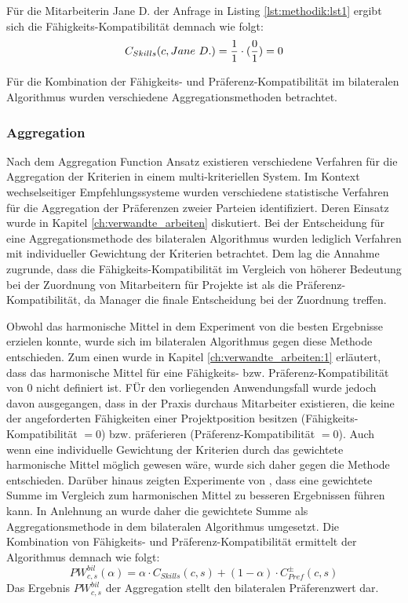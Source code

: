 Für die Mitarbeiterin Jane D. der Anfrage in Listing \ref{lst:methodik:lst1} ergibt sich die Fähigkeits-Kompatibilität demnach wie folgt:
\begin{equation}\label{methodik:eq:5}
    C_{Skills}(c,Jane \textnormal{ }D.) = \frac{1}{1} \cdot (\frac{0}{1}) = 0
\end{equation}

Für die Kombination der Fähigkeits- und Präferenz-Kompatibilität im bilateralen Algorithmus wurden verschiedene Aggregationsmethoden betrachtet.

\subsubsection{Aggregation}
Nach dem Aggregation Function Ansatz existieren verschiedene Verfahren für die Aggregation der Kriterien in einem multi-kriteriellen System.
Im Kontext wechselseitiger Empfehlungssysteme wurden verschiedene statistische Verfahren für die Aggregation der Präferenzen zweier Parteien identifiziert.
Deren Einsatz wurde in Kapitel \ref{ch:verwandte_arbeiten} diskutiert.
Bei der Entscheidung für eine Aggregationsmethode des bilateralen Algorithmus wurden lediglich Verfahren mit individueller Gewichtung der Kriterien betrachtet.
Dem lag die Annahme zugrunde, dass die Fähigkeits-Kompatibilität im Vergleich von höherer Bedeutung bei der Zuordnung von Mitarbeitern für Projekte ist als die Präferenz-Kompatibilität, da Manager die finale Entscheidung bei der Zuordnung treffen.

Obwohl das harmonische Mittel in dem Experiment von \textcite[S. 1ff.]{kumari:2:inproceedings} die besten Ergebnisse erzielen konnte, wurde sich im bilateralen Algorithmus gegen diese Methode entschieden.
Zum einen wurde in Kapitel \ref{ch:verwandte_arbeiten:1} erläutert, dass das harmonische Mittel für eine Fähigkeits- bzw. Präferenz-Kompatibilität von 0 nicht definiert ist.
FÜr den vorliegenden Anwendungsfall wurde jedoch davon ausgegangen, dass in der Praxis durchaus Mitarbeiter existieren, die keine der angeforderten Fähigkeiten einer Projektposition besitzen (Fähigkeits-Kompatibilität $= 0$) bzw. präferieren (Präferenz-Kompatibilität $= 0$).
Auch wenn eine individuelle Gewichtung der Kriterien durch das gewichtete harmonische Mittel möglich gewesen wäre, wurde sich daher gegen die Methode entschieden.
Darüber hinaus zeigten Experimente von \textcite[S. 131ff.]{kleinerman:2:inproceedings}, dass eine gewichtete Summe im Vergleich zum harmonischen Mittel zu besseren Ergebnissen führen kann.
In Anlehnung an \textcite[S. 131ff.]{kleinerman:2:inproceedings} wurde daher die gewichtete Summe als Aggregationsmethode in dem bilateralen Algorithmus umgesetzt.
Die Kombination von Fähigkeits- und Präferenz-Kompatibilität ermittelt der Algorithmus demnach wie folgt:
\begin{equation}\label{methodik:eq:6}
    PW_{c,s}^{bil}(\alpha) = \alpha \cdot C_{Skills}(c,s) + (1-\alpha) \cdot C_{Pref}^{\pm}(c,s)
\end{equation}
Das Ergebnis $PW_{c,s}^{bil}$ der Aggregation stellt den bilateralen Präferenzwert dar.

